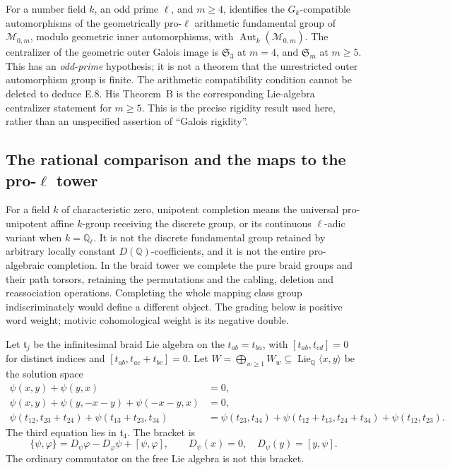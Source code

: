 For a number field $k$, an odd prime $\ell$, and $m\geq4$,
\citet[Theorem~A]{Nakamura1994} identifies the $G_k$-compatible
automorphisms of the geometrically pro-$\ell$ arithmetic fundamental
group of $\mathcal M_{0,m}$, modulo geometric inner automorphisms, with
$\operatorname{Aut}_k(\mathcal M_{0,m})$.  The centralizer of the
geometric outer Galois image is $\mathfrak S_3$ at $m=4$, and
$\mathfrak S_m$ at $m\geq5$.  This has an \emph{odd-prime} hypothesis;
it is not a theorem that the unrestricted outer automorphism group is
finite.  The arithmetic compatibility condition cannot be deleted to
deduce E.8.  His Theorem~B is the corresponding Lie-algebra centralizer
statement for $m\geq5$.  This is the precise rigidity result used here,
rather than an unspecified assertion of ``Galois rigidity''.

\subsection{The rational comparison and the maps to the pro-\texorpdfstring{$\ell$}{l} tower}

For a field $k$ of characteristic zero, unipotent completion means the
universal pro-unipotent affine $k$-group receiving the discrete group,
or its continuous $\ell$-adic variant when $k=\mathbb Q_\ell$.
It is not the discrete fundamental group retained by arbitrary locally
constant $D(\mathbb Q)$-coefficients, and it is not the entire
pro-algebraic completion.  In the braid tower we complete the pure braid
groups and their path torsors, retaining the permutations and the
cabling, deletion and reassociation operations.  Completing the whole
mapping class group indiscriminately would define a different object.
The grading below is positive word weight; motivic cohomological weight
is its negative double.

Let $\mathfrak t_j$ be the infinitesimal braid Lie algebra on the
$t_{ab}=t_{ba}$, with
$[t_{ab},t_{cd}]=0$ for distinct indices and
$[t_{ab},t_{ac}+t_{bc}]=0$.  Let
$W=\bigoplus_{w\geq1}W_w\subseteq\operatorname{Lie}_{\mathbb Q}
\langle x,y\rangle$ be the solution space
\begin{align*}
 \psi(x,y)+\psi(y,x)&=0,\\
 \psi(x,y)+\psi(y,-x-y)+\psi(-x-y,x)&=0,\\
 \psi(t_{12},t_{23}+t_{24})+\psi(t_{13}+t_{23},t_{34})
 &=\psi(t_{23},t_{34})+\psi(t_{12}+t_{13},t_{24}+t_{34})
    +\psi(t_{12},t_{23}).
\end{align*}
The third equation lies in $\mathfrak t_4$.  The bracket is
\[
 \{\psi,\varphi\}=D_\psi\varphi-D_\varphi\psi+[\psi,\varphi],
 \qquad D_\psi(x)=0,\quad D_\psi(y)=[y,\psi].
\]
The ordinary commutator on the free Lie algebra is not this bracket.

